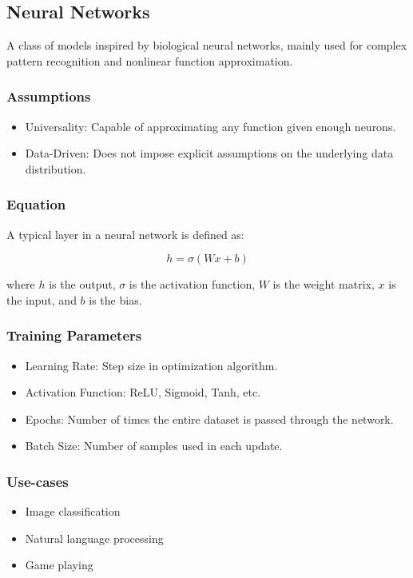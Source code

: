 \documentclass[english, threecolumn]{latex4ei/latex4ei_sheet}
\begin{document}
\begin{sectionbox}
\subsection{Neural Networks}

A class of models inspired by biological neural networks, mainly used for complex pattern recognition and nonlinear function approximation.

\subsubsection{Assumptions}
\begin{itemize}
    \item Universality: Capable of approximating any function given enough neurons.
    \item Data-Driven: Does not impose explicit assumptions on the underlying data distribution.
\end{itemize}

\subsubsection{Equation}
A typical layer in a neural network is defined as:

\[
h = \sigma(Wx + b)
\]

where \( h \) is the output, \( \sigma \) is the activation function, \( W \) is the weight matrix, \( x \) is the input, and \( b \) is the bias.

\subsubsection{Training Parameters}
\begin{itemize}
    \item Learning Rate: Step size in optimization algorithm.
    \item Activation Function: ReLU, Sigmoid, Tanh, etc.
    \item Epochs: Number of times the entire dataset is passed through the network.
    \item Batch Size: Number of samples used in each update.
\end{itemize}

\subsubsection{Use-cases}
\begin{itemize}
    \item Image classification
    \item Natural language processing
    \item Game playing
\end{itemize}


\end{sectionbox}
\end{document}
